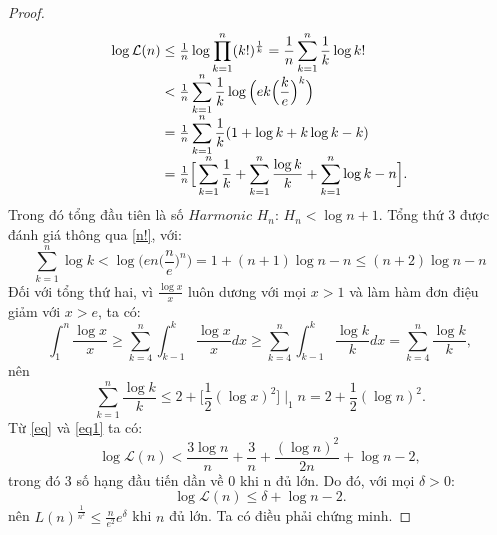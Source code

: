 \documentclass[a4paper, 12pt]{report}
\begin{document}
\begin{proof}
\begin{equation*}
\begin{array}{l@{}l}
			\log\mathcal{L}(n)
			&{} \leq \frac{1}{n}\log \displaystyle \prod_{k=1}^{n}(k!)^{\frac{1}{k}} = \frac{1}{n} \displaystyle \sum_{k=1}^{n}\frac{1}{k}\log k! \\ 
			&{} < \frac{1}{n}\displaystyle \sum_{k=1}^{n}\frac{1}{k}\log\Big( ek \Big(\frac{k}{e}\Big)^{k} \Big) \\
			&{} = \frac{1}{n} \displaystyle \sum_{k=1}^{n}\frac{1}{k}(1 +\log k + k\log k -k) \\
			&{} = \frac{1}{n} \Big[\displaystyle \sum_{k=1}^{n}\frac{1}{k} + \displaystyle \sum_{k=1}^{n}\frac{\log k}{k} + \displaystyle \sum_{k=1}^{n}\log k -n \Big].
		\end{array}
		\end{equation*}
		Trong đó tổng đầu tiên là số $Harmonic$ $H_n$: $H_n < \log n +1$. Tổng thứ 3 được đánh giá thông qua \eqref{n!}, với:
		\begin{equation}
			\displaystyle \sum_{k=1}^{n} \log k < \log\Big( en\Big(\frac{n}{e}\Big)^{n}\Big) = 1+ (n+1)\log n -n \leq (n+2 )\log n - n \label{eq}
		\end{equation}
		Đối với tổng thứ hai, vì $\frac{\log x}{x}$ luôn dương với mọi $x>1$ và làm hàm đơn điệu giảm với $x >e$, ta có:
		\begin{equation*}
			\int_{1}^{n}\frac{\log x}{x} \geq \displaystyle \sum_{k=4}^{n}\int_{k-1}^{k}\frac{\log x}{x}dx \geq \displaystyle \sum_{k=4}^{n}\int_{k-1}^{k}\frac{\log k}{k}dx = \displaystyle \sum_{k=4}^{n}\frac{\log k}{k},
		\end{equation*}
		nên 
		\begin{equation}
			 \displaystyle \sum_{k=1}^{n}\frac{\log k}{k} \leq 2 + \Big[\frac{1}{2}(\log x)^2\Big]\mid_{1}{n} = 2+ \frac{1}{2}(\log n)^2. \label{eq1}
		\end{equation}
Từ \eqref{eq} và \eqref{eq1} ta có: 
\begin{equation*}
	\log \mathcal{L}(n) < \frac{3\log n}{n} + \frac{3}{n} + \frac{(\log n)^2}{2n} + \log n -2,
\end{equation*}
trong đó 3 số hạng đầu tiến dần về 0 khi n đủ lớn. Do đó, với mọi $\delta >0$:
\begin{equation*}
	\log \mathcal{L}(n) \leq \delta +\log n -2 .
\end{equation*}
nên $L(n)^\frac{1}{n^2} \leq \frac{n}{e^2}e^{\delta}$ khi $n$ đủ lớn. Ta có điều phải chứng minh.
\end{proof}










%
%
%
\end{document}
